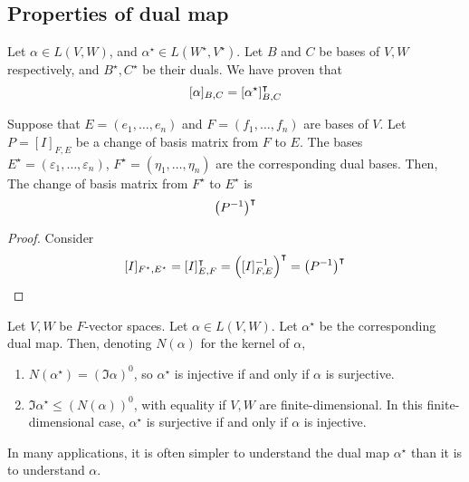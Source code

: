 \subsection{Properties of dual map}
Let \( \alpha \in L(V,W) \), and \( \alpha^\star \in L(W^\star, V^\star) \).
Let \( B \) and \( C \) be bases of \( V, W \) respectively, and \( B^\star, C^\star \) be their duals.
We have proven that
\[
	[\alpha]_{B,C} = [\alpha^\star]^\intercal_{B,C}
\]
\begin{lemma}
	Suppose that \( E = (e_1, \dots, e_n) \) and \( F = (f_1, \dots, f_n) \) are bases of \( V \).
	Let \( P = [I]_{F, E} \) be a change of basis matrix from \( F \) to \( E \).
	The bases \( E^\star = (\varepsilon_1, \dots, \varepsilon_n) \), \( F^\star = (\eta_1, \dots, \eta_n) \) are the corresponding dual bases.
	Then,
	The change of basis matrix from \( F^\star \) to \( E^\star \) is
	\[
		\qty(P^{-1})^\intercal
	\]
\end{lemma}
\begin{proof}
	Consider
	\[
		[I]_{F^\star, E^\star} = [I]^\intercal_{E, F} = \qty([I]_{F, E}^{-1})^\intercal = \qty(P^{-1})^\intercal
	\]
\end{proof}
\begin{lemma}
	Let \( V, W \) be \( F \)-vector spaces.
	Let \( \alpha \in L(V, W) \).
	Let \( \alpha^\star \) be the corresponding dual map.
	Then, denoting \( N(\alpha) \) for the kernel of \( \alpha \),
	\begin{enumerate}
		\item \( N(\alpha^\star) = (\Im \alpha)^0 \), so \( \alpha^\star \) is injective if and only if \( \alpha \) is surjective.
		\item \( \Im \alpha^\star \leq (N(\alpha))^0 \), with equality if \( V, W \) are finite-dimensional.
		      In this finite-dimensional case, \( \alpha^\star \) is surjective if and only if \( \alpha \) is injective.
	\end{enumerate}
\end{lemma}
\begin{remark}
	In many applications, it is often simpler to understand the dual map \( \alpha^\star \) than it is to understand \( \alpha \).
\end{remark}
